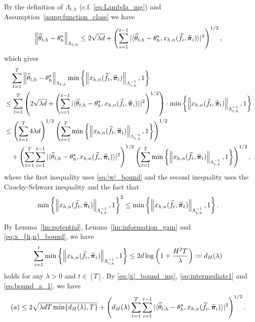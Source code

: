 By the definition of $\Lambda_{t,h}$ (c.f. \eqref{eq:Lambda_mg}) and Assumption~\ref{asmp:function_class} we have
\begin{align}\label{eq:|w|_bound_mg}
    \left\| \widehat{\theta}_{t,h}-\theta_h^\star \right\|_{\Lambda_{t,h}}\leq 2\sqrt{\lambda d}+\left(\sum_{i=1}^{t-1} |\langle \widehat{\theta}_{t,h}-\theta_h^\star,x_{h,n}(\widehat{f}_i,\widehat{{\bm{\pi}}}_i)\rangle|^2\right)^{1/2},
\end{align}
which gives
\begin{align}\label{eq:intermediate1}
    &\quad\sum_{t=1}^T \left\| \widehat{\theta}_{t,h}-\theta_h^\star \right\|_{\Lambda_{t,h}}\min\left\{ \left\| x_{h,n}(\widehat{f}_{t},\widehat{{\bm{\pi}}}_{t}) \right\|_{\Lambda_{t,h}^{-1}},1\right\}\notag\\
    &\leq \sum_{t=1}^T\left(2\sqrt{\lambda d} +\left(\sum_{i=1}^{t-1} |\langle \widehat{\theta}_{t,h}-\theta_h^\star,x_{h,n}(\widehat{f}_i,\widehat{{\bm{\pi}}}_i)\rangle|^2\right)^{1/2}\right)\cdot\min\left\{ \left\| x_{h,n}(\widehat{f}_{t},\widehat{{\bm{\pi}}}_{t}) \right\|_{\Lambda_{t,h}^{-1}},1\right\}\notag\\
    &\leq \left(\sum_{t=1}^T 4\lambda d\right)^{1/2}
    \left(\sum_{t=1}^T \min\left\{ \left\| x_{h,n}(\widehat{f}_{t},\widehat{{\bm{\pi}}}_{t}) \right\|_{\Lambda_{t,h}^{-1}},1\right\}\right)^{1/2}\notag\\
    &\quad + \left(\sum_{t=1}^T \sum_{i=1}^{t-1} |\langle \widehat{\theta}_{t,h}-\theta_h^\star,x_{h,n}(\widehat{f}_i,\widehat{{\bm{\pi}}}_i)\rangle|^2\right)^{1/2}\left(\sum_{t=1}^T \min\left\{ \left\| x_{h,n}(\widehat{f}_{t},\widehat{{\bm{\pi}}}_{t}) \right\|_{\Lambda_{t,h}^{-1}},1\right\}\right)^{1/2},
\end{align}
where the first inequality uses \eqref{eq:|w|_bound} and the second inequality uses the Cauchy-Schwarz inequality and the fact that 
$$\min\left\{ \left\| x_{h,n}(\widehat{f}_{t},\widehat{{\bm{\pi}}}_{t}) \right\|_{\Lambda_{t,h}^{-1}},1\right\}^2\leq \min\left\{ \left\| x_{h,n}(\widehat{f}_{t},\widehat{{\bm{\pi}}}_{t}) \right\|_{\Lambda_{t,h}^{-1}},1\right\}. $$


By Lemma~\ref{lm:potential}, Lemma~\ref{lm:information_gain} and \eqref{eq:x_{h,n}_bound}, we have
\begin{align}\label{eq:|x|_bound_mg}
    \sum_{i=1}^t \min\left\{ \left\| x_{h,n}(\widehat{f}_i,\widehat{{\bm{\pi}}}_i) \right\|_{\Lambda_{i,h}^{-1}},1\right\}\leq 2d\log\left(1+\frac{H^2T}{\lambda}\right)\coloneqq d_H(\lambda)
\end{align}
holds for any $\lambda>0$ and $t\in[T]$.
By \eqref{eq:|x|_bound_mg}, \eqref{eq:intermediate1} and \eqref{eq:bound_a_1}, we have
\begin{align}\label{eq:intermediate2}
    (a)\leq 2\sqrt{\lambda dT \min\{d_H(\lambda),T\}} + \left(d_H(\lambda)\sum_{t=1}^T \sum_{i=1}^{t-1} |\langle \widehat{\theta}_{t,h}-\theta_h^\star,x_{h,n}(\widehat{f}_i,\widehat{{\bm{\pi}}}_i)\rangle|^2\right)^{1/2}.
\end{align}

